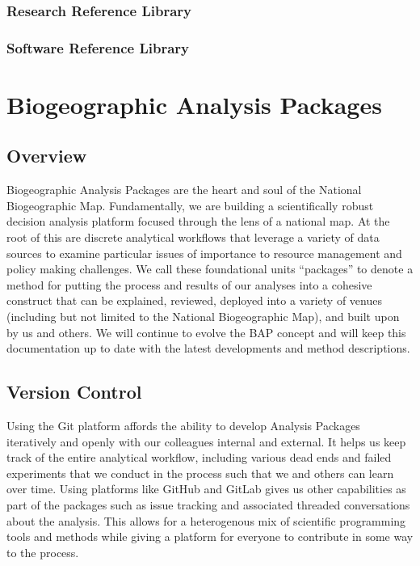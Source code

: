 \documentclass[letterpaper,10pt,english]{sphinxmanual}
\begin{document}
\subsection{Research Reference Library}
\label{\detokenize{bis:research-reference-library}}

\subsection{Software Reference Library}
\label{\detokenize{bis:software-reference-library}}

\chapter{Biogeographic Analysis Packages}
\label{\detokenize{baps:biogeographic-analysis-packages}}\label{\detokenize{baps:baps}}\label{\detokenize{baps::doc}}

\section{Overview}
\label{\detokenize{baps:overview}}
Biogeographic Analysis Packages are the heart and soul of the National Biogeographic Map. Fundamentally, we are building a scientifically robust decision analysis platform focused through the lens of a national map. At the root of this are discrete analytical workflows that leverage a variety of data sources to examine particular issues of importance to resource management and policy making challenges.  We call these foundational units “packages” to denote a method for putting the process and results of our analyses into a cohesive construct that can be explained, reviewed, deployed into a variety of venues (including but not limited to the National Biogeographic Map), and built upon by us and others. We will continue to evolve the BAP concept and will keep this documentation up to date with the latest developments and method descriptions.


\section{Version Control}
\label{\detokenize{baps:version-control}}
Using the Git platform affords the ability to develop Analysis Packages iteratively and openly with our colleagues internal and external. It helps us keep track of the entire analytical workflow, including various dead ends and failed experiments that we conduct in the process such that we and others can learn over time. Using platforms like GitHub and GitLab gives us other capabilities as part of the packages such as issue tracking and associated threaded conversations about the analysis. This allows for a heterogenous mix of scientific programming tools and methods while giving a platform for everyone to contribute in some way to the process.
\end{document}

